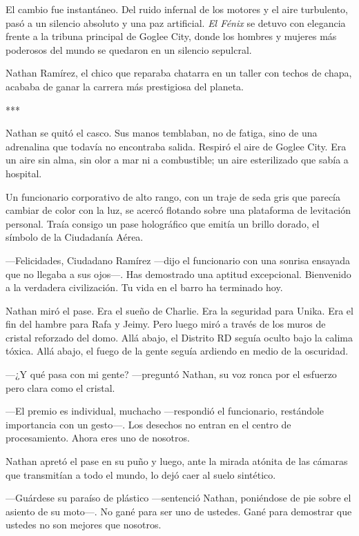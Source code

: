 \documentclass[11pt,twoside]{book}
\begin{document}
El cambio fue instantáneo. Del ruido infernal de los motores y el aire turbulento, pasó a un silencio absoluto y una paz artificial. \textit{El Fénix} se detuvo con elegancia frente a la tribuna principal de Goglee City, donde los hombres y mujeres más poderosos del mundo se quedaron en un silencio sepulcral.

Nathan Ramírez, el chico que reparaba chatarra en un taller con techos de chapa, acababa de ganar la carrera más prestigiosa del planeta.

\bigskip
\begin{center}***\end{center}
\bigskip

Nathan se quitó el casco. Sus manos temblaban, no de fatiga, sino de una adrenalina que todavía no encontraba salida. Respiró el aire de Goglee City. Era un aire sin alma, sin olor a mar ni a combustible; un aire esterilizado que sabía a hospital.

Un funcionario corporativo de alto rango, con un traje de seda gris que parecía cambiar de color con la luz, se acercó flotando sobre una plataforma de levitación personal. Traía consigo un pase holográfico que emitía un brillo dorado, el símbolo de la Ciudadanía Aérea.

---Felicidades, Ciudadano Ramírez ---dijo el funcionario con una sonrisa ensayada que no llegaba a sus ojos---. Has demostrado una aptitud excepcional. Bienvenido a la verdadera civilización. Tu vida en el barro ha terminado hoy.

Nathan miró el pase. Era el sueño de Charlie. Era la seguridad para Unika. Era el fin del hambre para Rafa y Jeimy. Pero luego miró a través de los muros de cristal reforzado del domo. Allá abajo, el Distrito RD seguía oculto bajo la calima tóxica. Allá abajo, el fuego de la gente seguía ardiendo en medio de la oscuridad.

---¿Y qué pasa con mi gente? ---preguntó Nathan, su voz ronca por el esfuerzo pero clara como el cristal.

---El premio es individual, muchacho ---respondió el funcionario, restándole importancia con un gesto---. Los desechos no entran en el centro de procesamiento. Ahora eres uno de nosotros.

Nathan apretó el pase en su puño y luego, ante la mirada atónita de las cámaras que transmitían a todo el mundo, lo dejó caer al suelo sintético.

---Guárdese su paraíso de plástico ---sentenció Nathan, poniéndose de pie sobre el asiento de su moto---. No gané para ser uno de ustedes. Gané para demostrar que ustedes no son mejores que nosotros.
\end{document}
